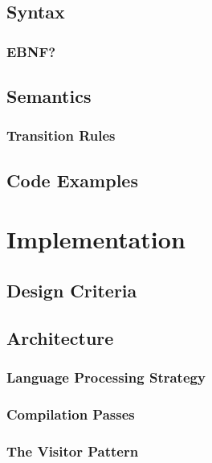 \section{Syntax}
\subsection{EBNF?}
\section{Semantics}
\subsection{Transition Rules}
\section{Code Examples}

\renewcommand{\ind}[1]{}
\chapter{Implementation}
\label{chap:implementation}
\section{Design Criteria}
\section{Architecture}
\ind{Architecture}	
\ind{Hardware}
\ind{OverviewCompiler}
\subsection{Language Processing Strategy}
\label{sec:LanguageProcessingStrategy}
\subsection{Compilation Passes}
\label{sec:CompilationPasses}
\ind{AbstractSyntaxTrees}
\ind{ParseTree}
\subsection{The Visitor Pattern}
